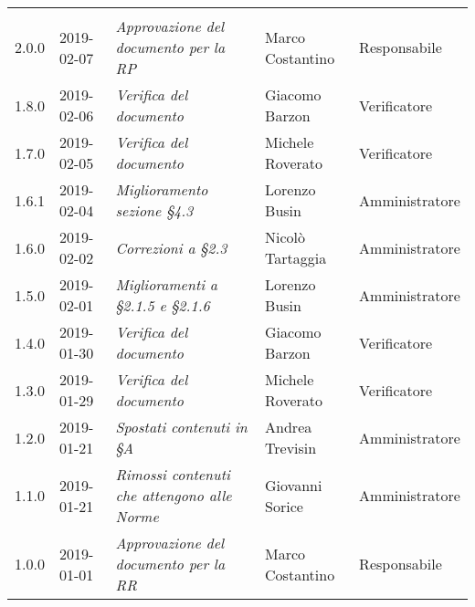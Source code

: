 \newpage 
\section*{}
	\begin{longtable}{C{2cm}|C{2.5cm}|C{4.5cm}|C{2.5cm}|C{3cm}}

	 &  &  &  &   \\
	\endhead
	
		2.0.0 & 2019-02-07 & \emph{Approvazione del documento per la RP} & Marco Costantino & Responsabile \\
		\hline
	
		1.8.0 & 2019-02-06 & \emph{Verifica del documento} & Giacomo Barzon & Verificatore \\
		\hline
		
		1.7.0 & 2019-02-05 & \emph{Verifica del documento} & Michele Roverato & Verificatore \\
		\hline
	
		1.6.1 & 2019-02-04 & \emph{Miglioramento sezione §4.3} & Lorenzo Busin & Amministratore \\
		\hline
		
		1.6.0 & 2019-02-02 & \emph{Correzioni a §2.3} & Nicolò Tartaggia & Amministratore \\
		\hline
	
		1.5.0 & 2019-02-01 & \emph{Miglioramenti a  §2.1.5 e §2.1.6} & Lorenzo Busin & Amministratore \\
		\hline
	
		1.4.0 & 2019-01-30 & \emph{Verifica del documento} & Giacomo Barzon & Verificatore \\
		\hline
		
		1.3.0 & 2019-01-29 & \emph{Verifica del documento} & Michele Roverato & Verificatore \\
		\hline
		
		1.2.0 & 2019-01-21 & \emph{Spostati contenuti in §A} & Andrea Trevisin & Amministratore \\
		\hline
	
		1.1.0 & 2019-01-21 & \emph{Rimossi contenuti che attengono alle Norme} & Giovanni Sorice & Amministratore \\
		\hline
		
		1.0.0 & 2019-01-01 & \emph{Approvazione del documento per la RR} & Marco Costantino & Responsabile \\
		\hline
		

\end{longtable}
